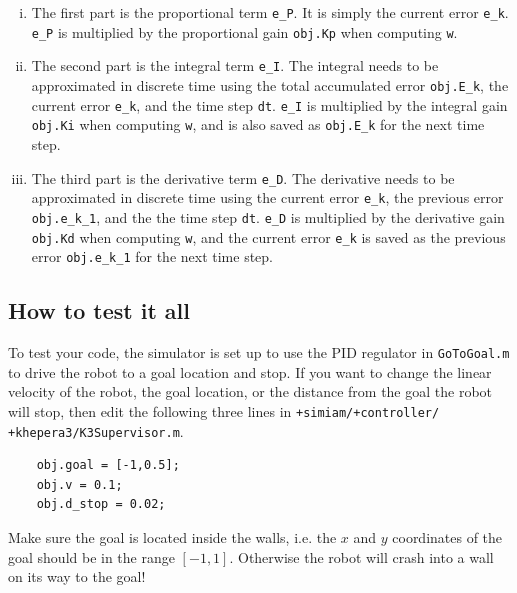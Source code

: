 \documentclass[10pt]{article}
\begin{document}
\begin{enumerate}
  \begin{enumerate}[(i)]
    \item The first part is the proportional term \texttt{e\_P}. It is simply the current error \texttt{e\_k}. \texttt{e\_P} is multiplied by the proportional gain \texttt{obj.Kp} when computing \texttt{w}.
    \item The second part is the integral term \texttt{e\_I}. The integral needs to be approximated in discrete time using the total accumulated error \texttt{obj.E\_k}, the current error \texttt{e\_k}, and the time step \texttt{dt}. \texttt{e\_I} is multiplied by the integral gain \texttt{obj.Ki} when computing \texttt{w}, and is also saved as \texttt{obj.E\_k} for the next time step.
    \item The third part is the derivative term \texttt{e\_D}. The derivative needs to be approximated in discrete time using the current error \texttt{e\_k}, the previous error \texttt{obj.e\_k\_1}, and the the time step \texttt{dt}. \texttt{e\_D} is multiplied by the derivative gain \texttt{obj.Kd} when computing \texttt{w}, and the current error \texttt{e\_k} is saved as the previous error \texttt{obj.e\_k\_1} for the next time step.
  \end{enumerate}
\end{enumerate}

\subsection*{How to test it all}

To test your code, the simulator is set up to use the PID regulator in \texttt{GoToGoal.m} to drive the robot to a goal location and stop. If you want to change the linear velocity of the robot, the goal location, or the distance from the goal the robot will stop, then edit the following three lines in \texttt{+simiam/+controller/} \texttt{+khepera3/K3Supervisor.m}.
  \begin{verbatim}
    obj.goal = [-1,0.5];
    obj.v = 0.1;
    obj.d_stop = 0.02;\end{verbatim}
Make sure the goal is located inside the walls, i.e. the $x$ and $y$ coordinates of the goal should be in the range $[-1,1]$. Otherwise the robot will crash into a wall on its way to the goal!
\end{document}

